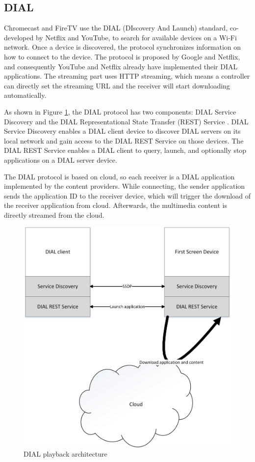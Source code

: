 \subsection{DIAL\label{2_2_4}} 
Chromecast and FireTV use the DIAL \cite{dial} (DIscovery And Launch) standard,
co-developed by Netflix and YouTube, to search for available devices on a Wi-Fi network. 
Once a device is discovered, the protocol synchronizes information on how to 
connect to the device. The protocol is proposed by Google and Netflix, and
consequently YouTube and Netflix already have implemented their DIAL
applications. The streaming part uses HTTP streaming, which means a controller can directly set
the streaming URL and the receiver will start downloading automatically.

As shown in Figure \ref{DIAL_use_scenario}, the DIAL protocol has two
components: DIAL Service Discovery and the DIAL Representational State Transfer
(REST) Service \cite{dial}. DIAL Service Discovery enables a DIAL client device
to discover DIAL servers on its local network and gain access to the DIAL REST
Service on those devices. The DIAL REST Service enables a DIAL client to query,
launch, and optionally stop applications on a DIAL server device. 

The DIAL protocol is based on cloud, so each receiver is a DIAL application
implemented by the content providers. While connecting, the sender application
sends the application ID to the receiver device, which will trigger
the download of the receiver application from cloud. Afterwards, the multimedia
content is directly streamed from the cloud.

\begin{figure}[htb] 
\centering \includegraphics[width=0.8\columnwidth]{charts/DIAL} 
\caption{DIAL playback architecture\label{DIAL_use_scenario}} 
\end{figure}  

